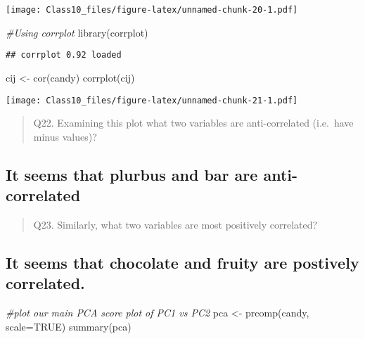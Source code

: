 \documentclass[
]{article}
\newenvironment{Shaded}{\begin{snugshade}}{\end{snugshade}}
\newcommand{\AttributeTok}[1]{\textcolor[rgb]{0.77,0.63,0.00}{#1}}
\newcommand{\CommentTok}[1]{\textcolor[rgb]{0.56,0.35,0.01}{\textit{#1}}}
\newcommand{\ConstantTok}[1]{\textcolor[rgb]{0.00,0.00,0.00}{#1}}
\newcommand{\FunctionTok}[1]{\textcolor[rgb]{0.00,0.00,0.00}{#1}}
\newcommand{\NormalTok}[1]{#1}
\newcommand{\OtherTok}[1]{\textcolor[rgb]{0.56,0.35,0.01}{#1}}
\begin{document}
\texttt{[image: Class10\_files/figure-latex/unnamed-chunk-20-1.pdf]}

\begin{Shaded}
\begin{Highlighting}[]
\CommentTok{\#Using corrplot}
\FunctionTok{library}\NormalTok{(corrplot)}
\end{Highlighting}
\end{Shaded}

\begin{verbatim}
## corrplot 0.92 loaded
\end{verbatim}

\begin{Shaded}
\begin{Highlighting}[]
\NormalTok{cij }\OtherTok{\textless{}{-}} \FunctionTok{cor}\NormalTok{(candy)}
\FunctionTok{corrplot}\NormalTok{(cij)}
\end{Highlighting}
\end{Shaded}

\texttt{[image: Class10\_files/figure-latex/unnamed-chunk-21-1.pdf]}

\begin{quote}
Q22. Examining this plot what two variables are anti-correlated
(i.e.~have minus values)?
\end{quote}

\hypertarget{it-seems-that-plurbus-and-bar-are-anti-correlated}{%
\subsection{It seems that plurbus and bar are
anti-correlated}\label{it-seems-that-plurbus-and-bar-are-anti-correlated}}

\begin{quote}
Q23. Similarly, what two variables are most positively correlated?
\end{quote}

\hypertarget{it-seems-that-chocolate-and-fruity-are-postively-correlated.}{%
\subsection{It seems that chocolate and fruity are postively
correlated.}\label{it-seems-that-chocolate-and-fruity-are-postively-correlated.}}

\begin{Shaded}
\begin{Highlighting}[]
\CommentTok{\#plot our main PCA score plot of PC1 vs PC2}
\NormalTok{pca }\OtherTok{\textless{}{-}} \FunctionTok{prcomp}\NormalTok{(candy, }\AttributeTok{scale=}\ConstantTok{TRUE}\NormalTok{)}
\FunctionTok{summary}\NormalTok{(pca)}
\end{Highlighting}
\end{Shaded}
\end{document}
